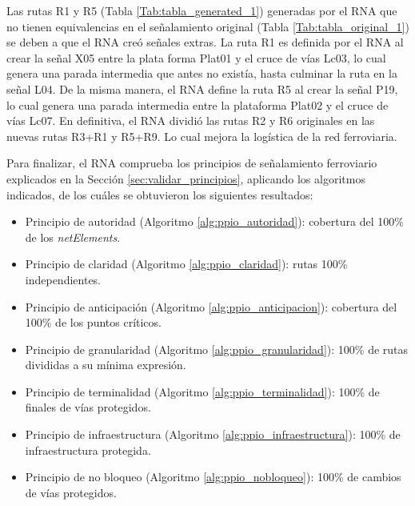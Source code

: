     Las rutas R1 y R5 (Tabla \ref{Tab:tabla_generated_1}) generadas por el RNA que no tienen equivalencias en el señalamiento original (Tabla \ref{Tab:tabla_original_1}) se deben a que el RNA creó señales extras. La ruta R1 es definida por el RNA al crear la señal X05 entre la plata forma Plat01 y el cruce de vías Lc03, lo cual genera una parada intermedia que antes no existía, hasta culminar la ruta en la señal L04. De la misma manera, el RNA define la ruta R5 al crear la señal P19, lo cual genera una parada intermedia entre la plataforma Plat02 y el cruce de vías Lc07. En definitiva, el RNA dividió las rutas R2 y R6 originales en las nuevas rutas R3+R1 y R5+R9. Lo cual mejora la logística de la red ferroviaria.
    
    Para finalizar, el RNA comprueba los principios de señalamiento ferroviario explicados en la Sección \ref{sec:validar_principios}, aplicando los algoritmos indicados, de los cuáles se obtuvieron los siguientes resultados:
    
    \begin{itemize}
    	\item Principio de autoridad (Algoritmo \ref{alg:ppio_autoridad}): cobertura del 100\% de los \textit{netElements}.
    	\item Principio de claridad (Algoritmo \ref{alg:ppio_claridad}): rutas 100\% independientes.
    	\item Principio de anticipación (Algoritmo \ref{alg:ppio_anticipacion}): cobertura del 100\% de los puntos críticos.
    	\item Principio de granularidad (Algoritmo \ref{alg:ppio_granularidad}): 100\% de rutas divididas a su mínima expresión.
    	\item Principio de terminalidad (Algoritmo \ref{alg:ppio_terminalidad}): 100\% de finales de vías protegidos.
    	\item Principio de infraestructura (Algoritmo \ref{alg:ppio_infraestructura}): 100\% de infraestructura protegida.
    	\item Principio de no bloqueo (Algoritmo \ref{alg:ppio_nobloqueo}): 100\% de cambios de vías protegidos.
    \end{itemize}	